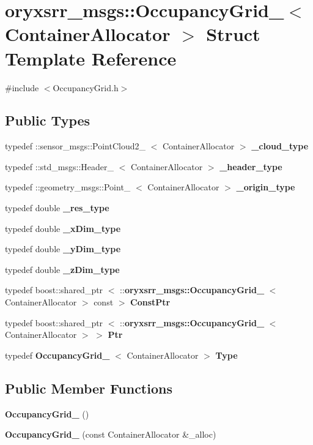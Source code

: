 \section{oryxsrr\-\_\-msgs\-:\-:\-Occupancy\-Grid\-\_\-$<$ \-Container\-Allocator $>$ \-Struct \-Template \-Reference}
\label{structoryxsrr__msgs_1_1OccupancyGrid__}


{\ttfamily \#include $<$\-Occupancy\-Grid.\-h$>$}

\subsection*{\-Public \-Types}
\begin{DoxyCompactItemize}
\item 
typedef \*
\-::sensor\-\_\-msgs\-::\-Point\-Cloud2\-\_\-\*
$<$ \-Container\-Allocator $>$ {\bf \-\_\-cloud\-\_\-type}
\item 
typedef \-::std\-\_\-msgs\-::\-Header\-\_\-\*
$<$ \-Container\-Allocator $>$ {\bf \-\_\-header\-\_\-type}
\item 
typedef \*
\-::geometry\-\_\-msgs\-::\-Point\-\_\-\*
$<$ \-Container\-Allocator $>$ {\bf \-\_\-origin\-\_\-type}
\item 
typedef double {\bf \-\_\-res\-\_\-type}
\item 
typedef double {\bf \-\_\-x\-Dim\-\_\-type}
\item 
typedef double {\bf \-\_\-y\-Dim\-\_\-type}
\item 
typedef double {\bf \-\_\-z\-Dim\-\_\-type}
\item 
typedef boost\-::shared\-\_\-ptr\*
$<$ \-::{\bf oryxsrr\-\_\-msgs\-::\-Occupancy\-Grid\-\_\-}\*
$<$ \-Container\-Allocator $>$ const  $>$ {\bf \-Const\-Ptr}
\item 
typedef boost\-::shared\-\_\-ptr\*
$<$ \-::{\bf oryxsrr\-\_\-msgs\-::\-Occupancy\-Grid\-\_\-}\*
$<$ \-Container\-Allocator $>$ $>$ {\bf \-Ptr}
\item 
typedef {\bf \-Occupancy\-Grid\-\_\-}\*
$<$ \-Container\-Allocator $>$ {\bf \-Type}
\end{DoxyCompactItemize}
\subsection*{\-Public \-Member \-Functions}
\begin{DoxyCompactItemize}
\item 
{\bf \-Occupancy\-Grid\-\_\-} ()
\item 
{\bf \-Occupancy\-Grid\-\_\-} (const \-Container\-Allocator \&\-\_\-alloc)
\end{DoxyCompactItemize}
